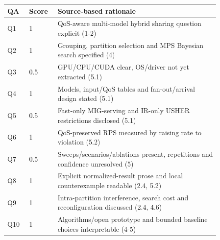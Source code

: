 \begin{longtable}{P{0.09\linewidth}P{0.10\linewidth}P{0.67\linewidth}}
\toprule QA & Score & Source-based rationale\\\midrule\endhead
Q1 & 1 & QoS-aware multi-model hybrid sharing question explicit (1-2)\\
Q2 & 1 & Grouping, partition selection and MPS Bayesian search specified (4)\\
Q3 & 0.5 & GPU/CPU/CUDA clear, OS/driver not yet extracted (5.1)\\
Q4 & 1 & Models, input/QoS tables and fan-out/arrival design stated (5.1)\\
Q5 & 0.5 & Fast-only MIG-serving and IR-only USHER restrictions disclosed (5.1)\\
Q6 & 1 & QoS-preserved RPS measured by raising rate to violation (5.2)\\
Q7 & 0.5 & Sweeps/scenarios/ablations present, repetitions and confidence unresolved (5)\\
Q8 & 1 & Explicit normalized-result prose and local counterexample readable (2.4, 5.2)\\
Q9 & 1 & Intra-partition interference, search cost and reconfiguration discussed (2.4, 4.6)\\
Q10 & 1 & Algorithms/open prototype and bounded baseline choices interpretable (4-5)\\
\bottomrule\end{longtable}


